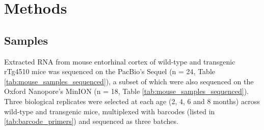 

\section{Methods}

\subsection{Samples}
Extracted RNA from mouse entorhinal cortex of wild-type and transgenic rTg4510 mice was sequenced on the PacBio's Sequel (n = 24, Table \ref{tab:mouse_samples_sequenced}), a subset of which were also sequenced on the Oxford Nanopore's MinION (n = 18, Table \ref{tab:mouse_samples_sequenced}). Three biological replicates were selected at each age (2, 4, 6 and 8 months) across wild-type and transgenic mice, multiplexed with barcodes (listed in \cref{tab:barcode_primers}) and sequenced as three batches.


